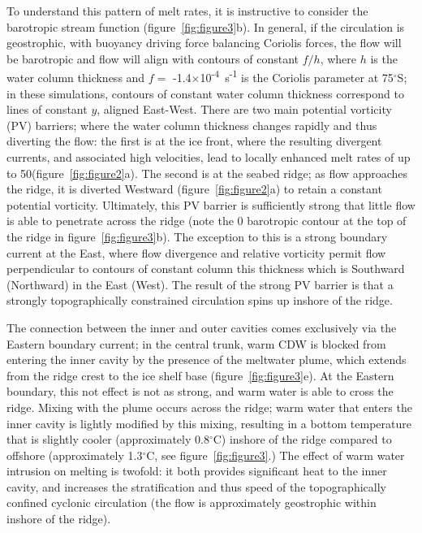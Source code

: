 \documentclass[draft]{agujournal2019}
\begin{document}
To understand this pattern of melt rates, it is instructive to consider the barotropic stream function (figure~\ref{fig:figure3}b). In general, if the circulation is geostrophic, with buoyancy driving force balancing Coriolis forces, the flow will be barotropic and flow will align with contours of constant $f/h$, where $h$ is the water column thickness and $f =$ -1.4$\times$10\textsuperscript{-4}~s\textsuperscript{-1} is the Coriolis parameter at 75${}^\circ$S; in these simulations, contours of constant water column thickness correspond to lines of constant $y$, aligned East-West. There are two main potential vorticity (PV) barriers; where the water column thickness changes rapidly and thus diverting the flow: the first is at the ice front, where the resulting divergent currents, and associated high velocities, lead to locally enhanced melt rates of up to 50\mpryr (figure~\ref{fig:figure2}a). The second is at the seabed ridge; as flow approaches the ridge, it is diverted Westward (figure~\ref{fig:figure2}a) to retain a constant potential vorticity. Ultimately, this PV barrier is sufficiently strong that little flow is able to penetrate across the ridge (note the 0 barotropic contour at the top of the ridge in figure~\ref{fig:figure3}b). The exception to this is a strong boundary current at the East, where flow divergence and relative vorticity permit flow perpendicular to contours of constant column this thickness which is Southward (Northward) in the East (West). The result of the strong PV barrier is that a strongly topographically constrained circulation spins up inshore of the ridge. %

The connection between the inner and outer cavities comes exclusively via the Eastern boundary current; in the central trunk, warm CDW is blocked from entering the inner cavity by the presence of the meltwater plume, which extends from the ridge crest to the ice shelf base (figure~\ref{fig:figure3}e). At the Eastern boundary, this not effect is not as strong, and warm water is able to cross the ridge. Mixing with the plume occurs across the ridge; warm water that enters the inner cavity is lightly modified by this mixing, resulting in a bottom temperature that is slightly cooler (approximately 0.8${}^\circ$C) inshore of the ridge compared to offshore (approximately 1.3${}^\circ$C, see figure~\ref{fig:figure3}.) The effect of warm water intrusion on melting is twofold: it both provides significant heat to the inner cavity, and increases the stratification and thus speed of the topographically confined cyclonic circulation (the flow is approximately geostrophic within inshore of the ridge).
\end{document}
